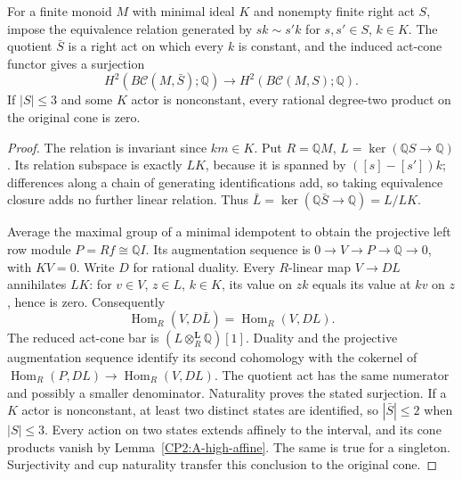 \begin{lemma}
\label{CP2:A-constant-quotient-H2}
For a finite monoid $M$ with minimal ideal $K$ and nonempty
finite right act $S$, impose the equivalence relation generated
by $sk\sim s'k$ for $s,s'\in S$, $k\in K$. The quotient
$\bar S$ is a right act on which every $k$ is constant, and
the induced act-cone functor gives a surjection
\[
 H^2(B\mathcal C(M,\bar S);\mathbb Q)
 \longrightarrow H^2(B\mathcal C(M,S);\mathbb Q).
\]
If $|S|\leq3$ and some $K$ actor is nonconstant, every
rational degree-two product on the original cone is zero.
\end{lemma}
\begin{proof}
The relation is invariant since $km\in K$. Put
$R=\mathbb QM$, $L=\ker(\mathbb QS\to\mathbb Q)$.
Its relation subspace is exactly $LK$, because it is
spanned by $([s]-[s'])k$; differences along a chain of
generating identifications add, so taking equivalence
closure adds no further linear relation. Thus
$\bar L=\ker(\mathbb Q\bar S\to\mathbb Q)=L/LK$.

Average the maximal group of a minimal idempotent to
obtain the projective left row module $P=Rf\cong\mathbb QI$.
Its augmentation sequence is
$0\to V\to P\to\mathbb Q\to0$, with $KV=0$.
Write $D$ for rational duality. Every $R$-linear map
$V\to DL$ annihilates $LK$: for $v\in V$, $z\in L$,
$k\in K$, its value on $zk$ equals its value at $kv$
on $z$, hence is zero. Consequently
\[
 \operatorname{Hom}_R(V,D\bar L)
   =\operatorname{Hom}_R(V,DL).
\]
The reduced act-cone bar is $(L\otimes_R^{\mathbf L}\mathbb Q)[1]$.
Duality and the projective augmentation sequence identify
its second cohomology with the cokernel of
$\operatorname{Hom}_R(P,DL)\to\operatorname{Hom}_R(V,DL)$.
The quotient act has the same numerator and possibly a
smaller denominator. Naturality proves the stated surjection.
If a $K$ actor is nonconstant, at least two distinct states
are identified, so $|\bar S|\leq2$ when $|S|\leq3$.
Every action on two states extends affinely to the interval,
and its cone products vanish by Lemma~\ref{CP2:A-high-affine}.
The same is true for a singleton. Surjectivity and cup
naturality transfer this conclusion to the original cone.
\end{proof}

